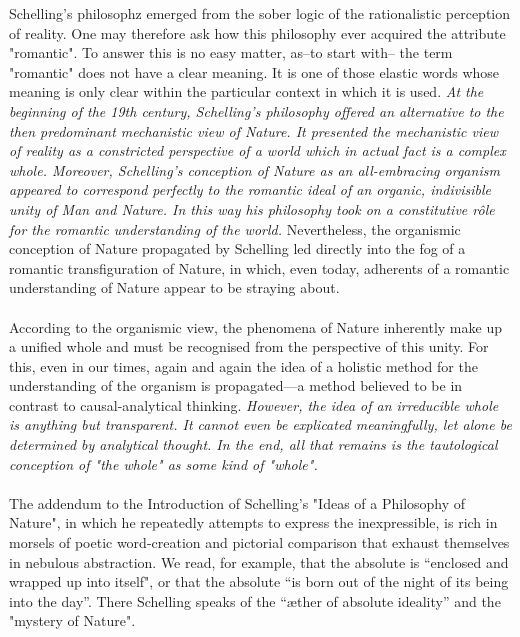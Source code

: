 \documentclass[9pt,a4paper,twocolumn]{article}
\begin{document}
            \indent Schelling's philosophz emerged from the sober logic of the rationalistic perception of reality. One may therefore ask how this philosophy ever acquired the attribute "romantic". To answer this is no easy matter, as--to start with-- the term "romantic" does not have a clear meaning. It is one of those elastic words whose meaning is only clear within the particular context in which it is used. \textit{At the beginning of the 19th century, Schelling's philosophy offered an alternative to the then predominant mechanistic view of Nature. It presented the mechanistic view of reality as a constricted perspective of a world which in actual fact is a complex whole. Moreover, Schelling's conception of Nature as an all-embracing organism appeared to correspond perfectly to the romantic ideal of an organic, indivisible unity of Man and Nature. In this way his philosophy took on a constitutive rôle for the romantic understanding of the world.} Nevertheless, the organismic conception of Nature propagated by Schelling led directly into the fog of a romantic transfiguration of Nature, in which, even today, adherents of a romantic understanding of Nature appear to be straying about.
            \\
            \\
            According to the organismic view, the phenomena of Nature inherently make up a unified whole and must be recognised from the perspective of this unity. For this, even in our times, again and again the idea of a holistic method for the understanding of the organism is propagated—a method believed to be in contrast to causal-analytical thinking. \textit{However, the idea of an irreducible whole is anything but transparent. It cannot even be explicated meaningfully, let alone be determined by analytical thought. In the end, all that remains is the tautological conception of "the whole" as some kind of "whole".}
            \\
            \\
            The addendum to the Introduction of Schelling's "Ideas of a Philosophy of Nature", in which he repeatedly attempts to express the inexpressible, is rich in morsels of poetic word-creation and pictorial comparison that exhaust themselves in nebulous abstraction. We read, for example, that the absolute is “enclosed and wrapped up into itself", or that the absolute “is born out of the night of its being into the day”. There Schelling speaks of the “æther of absolute ideality” and the "mystery of Nature".
            \\
\end{document}
